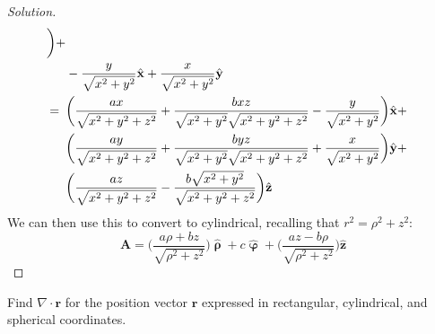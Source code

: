 \documentclass[crop=false,class=article,oneside]{standalone}
\begin{document}
\begin{proof}[Solution]
\begin{align*}
                \bigg)+\\
                &-\frac{y}{\sqrt{x^{2}+y^{2}}}\hat{\mathbf{x}}
                +\frac{x}{\sqrt{x^{2}+y^{2}}}\hat{\mathbf{y}}\\
                =\hspace{0.5em}
                &\bigg(
                    \frac{ax}{\sqrt{x^{2}+y^{2}+z^{2}}}
                    +\frac{bxz}
                          {\sqrt{x^{2}+y^{2}}
                           \sqrt{x^{2}+y^{2}+z^{2}}}
                    -\frac{y}{\sqrt{x^{2}+y^{2}}}
                \bigg)\hat{\mathbf{x}}+\\
                &\bigg(
                    \frac{ay}{\sqrt{x^{2}+y^{2}+z^{2}}}
                    +\frac{byz}
                          {\sqrt{x^{2}+y^{2}}
                           \sqrt{x^{2}+y^{2}+z^{2}}}
                        +\frac{x}{\sqrt{x^{2}+y^{2}}}
                \bigg)\hat{\mathbf{y}}+\\
                &\bigg(
                    \frac{az}{\sqrt{x^{2}+y^{2}+z^{2}}}
                    -\frac{b\sqrt{x^{2}+y^{2}}}
                          {\sqrt{x^{2}+y^{2}+z^{2}}}
                \bigg)
                \hat{\mathbf{z}}
            \end{align*}
            We can then use this to convert to cylindrical,
            recalling that $r^{2}=\rho^{2}+z^{2}$:
            \begin{equation*}
                \mathbf{A}
                =\bigg(
                    \frac{a\rho+bz}{\sqrt{\rho^{2}+z^{2}}}
                \bigg)
                \hat{\boldsymbol{\uprho}}
                +c\hat{\boldsymbol{\upvarphi}}
                +\bigg(
                    \frac{az-b\rho}{\sqrt{\rho^{2}+z^{2}}}
                \bigg)\hat{\mathbf{z}}
            \end{equation*}
        \end{proof}
        \begin{problem}[Wangsness 1-21]
            Find $\nabla\cdot\mathbf{r}$ for the position
            vector $\mathbf{r}$ expressed in rectangular,
            cylindrical, and spherical coordinates.
        \end{problem}
\end{document}
